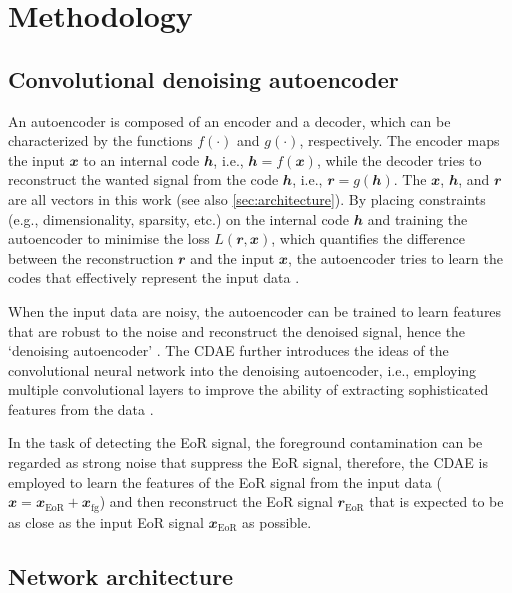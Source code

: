 \documentclass[letters,fleqn,usenatbib,onecolumn]{mnras}
\newcommand{\R}[1]{\mathrm{#1}}
\newcommand{\B}[1]{\mathbfit{#1}}
\begin{document}
\section{Methodology}
\label{sec:method}

\subsection{Convolutional denoising autoencoder}
\label{sec:cdae}

An autoencoder is composed of an encoder and a decoder, which can be
characterized by the functions $f(\cdot)$ and $g(\cdot)$, respectively.
The encoder maps the input $\B{x}$ to an internal code $\B{h}$, i.e.,
$\B{h} = f(\B{x})$, while the decoder tries to reconstruct the wanted
signal from the code $\B{h}$, i.e., $\B{r} = g(\B{h})$.
{\color{cyan}%
The $\B{x}$, $\B{h}$, and $\B{r}$ are all vectors in this work
(see also \autoref{sec:architecture}).}
By placing constraints (e.g., dimensionality, sparsity, etc.\@) on the
internal code $\B{h}$ and training the autoencoder to minimise the
loss $L(\B{r}, \B{x})$, which quantifies the difference between the
reconstruction $\B{r}$ and the input $\B{x}$, the autoencoder tries to
learn the codes that effectively represent the input data
\citep[e.g.,][chapter 14]{goodfellow2016}.
{\color{cyan}%
When the input data are noisy, the autoencoder can be trained to learn
features that are robust to the noise and reconstruct the denoised signal,
hence the `denoising autoencoder' \citep{vincent2008,vincent2010}.
The CDAE further introduces the ideas of the convolutional neural network
into the denoising autoencoder, i.e., employing multiple convolutional
layers to improve the ability of extracting sophisticated features
from the data \citep{du2017}.

In the task of detecting the EoR signal, the foreground contamination
can be regarded as strong noise that suppress the EoR signal, therefore,
the CDAE is employed to learn the features of the EoR signal from the
input data ($\B{x} = \B{x}_{\R{EoR}} + \B{x}_{\R{fg}}$) and then
reconstruct the EoR signal $\B{r}_{\R{EoR}}$ that is expected to be as
close as the input EoR signal $\B{x}_{\R{EoR}}$ as possible.} %


\subsection{Network architecture}
\label{sec:architecture}
\end{document}
